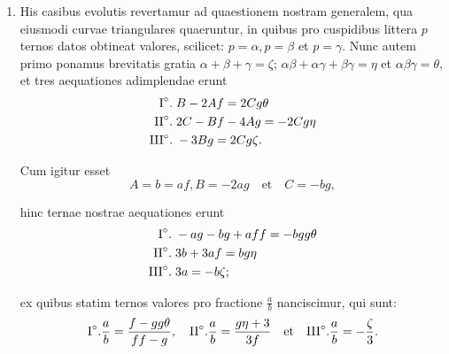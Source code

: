 \documentclass[10pt,a4paper]{article}
\begin{document}
\begin{paracol}{2}
\begin{enumerate}[topsep=1px]
		\switchcolumn*
		
		\item His casibus evolutis revertamur ad quaestionem nostram generalem, qua eiusmodi curvae triangulares quaeruntur, in quibus pro cuspidibus littera $p$ ternos datos obtineat valores, scilicet: $p=\alpha, p=\beta$ et $p=\gamma$. Nunc autem primo ponamus brevitatis gratia $\alpha+\beta+\gamma = \zeta$; $\alpha\beta + \alpha \gamma + \beta \gamma = \eta$ et $\alpha \beta \gamma = \theta$, et tres aequationes adimplendae erunt
		\begin{align*}
			\text{I}\degree. \;&B -2Af = 2Cg\theta\\
			\text{II}\degree. \;& 2C-Bf-4Ag = -2Cg\eta\\
			\text{III}\degree. \;& -3Bg = 2Cg\zeta.
		\end{align*}
		\par Cum igitur esset
		\[
			A=b=af, B=-2ag \quad \text{et}\quad C= -bg,
		\]
		\par hinc ternae nostrae aequationes erunt
		\begin{align*}
			\text{I}\degree. \;& -ag -bg+aff = -bgg\theta\\
			\text{II}\degree. \;& 3b +3af = bg\eta\\
			\text{III}\degree. \;& 3a=-b\zeta;		
		\end{align*}
		\par ex quibus statim ternos valores pro fractione $\frac{a}{b}$ nanciscimur, qui sunt:
		\[
			\text{I}\degree. \frac{a}{b} = \frac{f-gg\theta}{ff-g},\quad  \text{II}\degree. \frac{a}{b} = \frac{g\eta + 3}{3f} \quad \text{et}\quad \text{III}\degree. \frac{a}{b} = -\frac{\zeta}{3}.
		\]
		

\end{enumerate}
\end{paracol}
\end{document}
